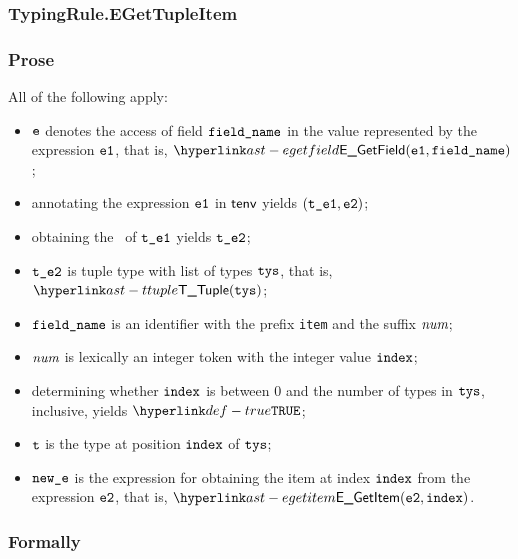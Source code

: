 \subsubsection{TypingRule.EGetTupleItem \label{sec:TypingRule.EGetTupleItem}}
\subsubsection{Prose}
All of the following apply:
\begin{itemize}
  \item $\ve$ denotes the access of field $\fieldname$ in the value represented by the expression $\veone$, that is, $\EGetField(\veone, \fieldname)$;
  \item annotating the expression $\veone$ in $\tenv$ yields $(\vteone, \vetwo)$\ProseOrTypeError;
  \item obtaining the \underlyingtype\ of $\vteone$ yields $\vtetwo$\ProseOrTypeError;
  \item $\vtetwo$ is tuple type with list of types $\tys$, that is, $\TTuple(\tys)$;
  \item $\fieldname$ is an identifier with the prefix \texttt{item} and the suffix $\num$;
  \item $\num$ is lexically an integer token with the integer value $\vindex$;
  \item determining whether $\vindex$ is between $0$ and the number of types in $\tys$, inclusive, yields $\True$\ProseOrTypeError;
  \item $\vt$ is the type at position $\vindex$ of $\tys$;
  \item $\newe$ is the expression for obtaining the item at index $\vindex$ from the expression $\vetwo$, that is, $\EGetItem(\vetwo, \vindex)$.
\end{itemize}
\subsubsection{Formally}
\begin{mathpar}
\end{mathpar}

